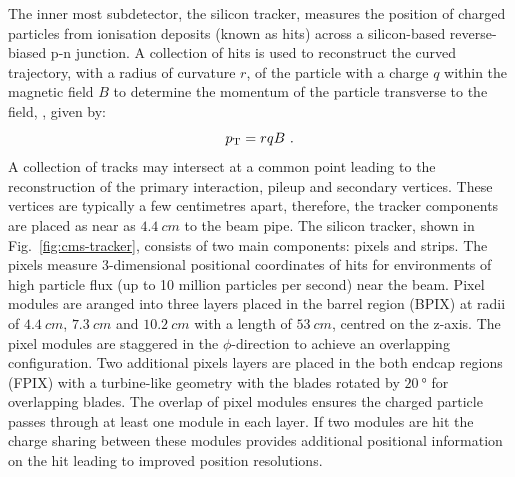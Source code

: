 The inner most subdetector, the silicon tracker, measures the position of
charged particles from ionisation deposits (known as hits) across a
silicon-based reverse-biased p-n junction. A collection of hits is used to
reconstruct the curved trajectory, with a radius of curvature $r$, of the
particle with a charge $q$ within the magnetic field $B$ to determine the
momentum of the particle transverse to the field, \pt, given by:
%
\begin{equation}
    p_{\text{T}} = rqB\ .
\end{equation}
%
A collection of tracks may intersect at a common point leading to the
reconstruction of the primary interaction, pileup and secondary vertices.
These vertices are typically a few centimetres apart, therefore, the tracker
components are placed as near as ${\SI{4.4}{cm}}$ to the beam pipe.  The
silicon tracker, shown in Fig.~\ref{fig:cms-tracker}, consists of two main
components: pixels and strips. The pixels measure 3-dimensional positional
coordinates of hits for environments of high particle flux (up to 10 million
particles per second) near the beam. Pixel modules are aranged into three
layers placed in the barrel region (BPIX) at radii of ${\SI{4.4}{cm}}$,
${\SI{7.3}{cm}}$ and ${\SI{10.2}{cm}}$ with a length of ${\SI{53}{cm}}$,
centred on the z-axis. The pixel modules are staggered in the $\phi$-direction
to achieve an overlapping configuration. Two additional pixels layers are
placed in the both endcap regions (FPIX) with a turbine-like geometry with the
blades rotated by ${\SI{20}{\degree}}$ for overlapping blades. The overlap of
pixel modules ensures the charged particle passes through at least one module
in each layer. If two modules are hit the charge sharing between these modules
provides additional positional information on the hit leading to improved
position resolutions.

